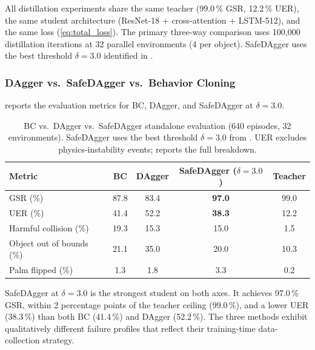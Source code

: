All distillation experiments share the same teacher (99.0\,\% \ac{GSR}, 12.2\,\% \ac{UER}), the same student architecture (ResNet-18 + cross-attention + LSTM-512), and the same loss (\cref{eq:total_loss}).
The primary three-way comparison uses 100{,}000 distillation iterations at 32 parallel environments (4 per object).
SafeDAgger uses the best threshold $\delta = 3.0$ identified in .

\subsubsection{DAgger vs.\ SafeDAgger vs.\ Behavior Cloning}%
\label{sec:dagger_results}%

 reports the evaluation metrics for \ac{BC}, DAgger, and SafeDAgger at $\delta = 3.0$.

\begin{table}[htb]
    \centering
    \caption{BC vs.\ DAgger vs.\ SafeDAgger standalone evaluation (640 episodes, 32 environments). SafeDAgger uses the best threshold $\delta = 3.0$ from . \acs{UER} excludes physics-instability events;  reports the full breakdown.}
    \label{tab:distillation_comparison}
    \begin{tabular}{lcccc}
        \toprule
        \textbf{Metric} & \textbf{\ac{BC}} & \textbf{DAgger} & \textbf{SafeDAgger ($\delta = 3.0$)} & \textbf{Teacher} \\
        \midrule
        \acs{GSR} (\%) & 87.8 & 83.4 & \textbf{97.0} & 99.0 \\
        \acs{UER} (\%) & 41.4 & 52.2 & \textbf{38.3} & 12.2 \\
        \quad Harmful collision (\%) & 19.3 & 15.3 & 15.0 & 1.5 \\
        \quad Object out of bounds (\%) & 21.1 & 35.0 & 20.0 & 10.3 \\
        \quad Palm flipped (\%) & 1.3 & 1.8 & 3.3 & 0.2 \\
        \bottomrule
    \end{tabular}
\end{table}

SafeDAgger at $\delta = 3.0$ is the strongest student on both axes.
It achieves 97.0\,\% \ac{GSR}, within 2 percentage points of the teacher ceiling (99.0\,\%), and a lower \ac{UER} (38.3\,\%) than both \ac{BC} (41.4\,\%) and DAgger (52.2\,\%).
The three methods exhibit qualitatively different failure profiles that reflect their training-time data-collection strategy.

